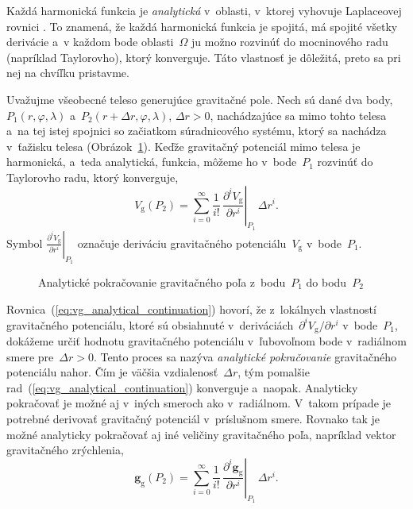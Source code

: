 \documentclass[a4paper,12pt]{book}
\newcommand{\gidx}{\mathrm g}
\let\vec\mathbf
\begin{document}
Každá harmonická funkcia je \emph{analytická} v~oblasti, v~ktorej vyhovuje
Laplaceovej rovnici \parencite{MoritzPhysicalGeodesy}.  To znamená, že každá
harmonická funkcia je spojitá, má spojité všetky derivácie a~v každom bode
oblasti~$\Omega$ ju možno rozvinúť do mocninového radu (napríklad Taylorovho),
ktorý konverguje.  Táto vlastnosť je dôležitá, preto sa pri nej na chvíľku
pristavme.

Uvažujme všeobecné teleso generujúce gravitačné pole.  Nech sú dané dva body,
$P_1(r, \varphi, \lambda)$ a~$P_2(r + \Delta r, \varphi, \lambda)$, $\Delta
r > 0$, nachádzajúce sa mimo tohto telesa a~na tej istej spojnici so začiatkom
súradnicového systému, ktorý sa nachádza v~ťažisku telesa
(Obrázok~\ref{fig:analytical_continuation}).  Keďže gravitačný potenciál mimo
telesa je harmonická, a~teda analytická, funkcia, môžeme ho v~bode~$P_1$
rozvinúť do Taylorovho radu, ktorý konverguje,
%
\begin{equation}
\label{eq:vg_analytical_continuation}
V_\gidx(P_2) = \sum_{i = 0}^\infty \frac{1}{i!} \, \left.\frac{\partial^i
V_\gidx}{\partial r^i}\right|_{P_1} \, \Delta r^i{.}
\end{equation}
%
Symbol $\left.\frac{\partial^i V_\gidx}{\partial r^i} \right|_{P_1}$ označuje 
deriváciu gravitačného potenciálu~$V_\gidx$ v~bode~$P_1$.

\begin{figure}

\centering

\caption{Analytické pokračovanie gravitačného poľa z~bodu~$P_1$ do bodu~$P_2$}
\label{fig:analytical_continuation}
\end{figure}

Rovnica~(\ref{eq:vg_analytical_continuation}) hovorí, že z~lokálnych vlastností 
gravitačného potenciálu, ktoré sú obsiahnuté v~deriváciách~$\partial^i V_\gidx 
\slash \partial r^i$ v~bode~$P_1$, dokážeme určiť hodnotu gravitačného 
potenciálu v~ľubovoľnom bode v~radiálnom smere pre~$\Delta r > 0$.  Tento 
proces sa nazýva \emph{analytické pokračovanie} gravitačného potenciálu nahor.  
Čím je väčšia vzdialenosť~$\Delta r$, tým pomalšie 
rad~(\ref{eq:vg_analytical_continuation}) konverguje a~naopak.  Analyticky 
pokračovať je možné aj v~iných smeroch ako v~radiálnom.  V~takom prípade je 
potrebné derivovať gravitačný potenciál v~príslušnom smere.  Rovnako tak je 
možné analyticky pokračovať aj iné veličiny gravitačného poľa, napríklad vektor 
gravitačného zrýchlenia,
%
\begin{equation}
\label{eq:gg_analytical_continuation}
\vec g_\gidx(P_2) = \sum_{i = 0}^{\infty} \frac{1}{i!} \, 
\left.\frac{\partial^i \vec
g_\gidx}{\partial r^i}\right|_{P_1} \, \Delta r^i{.}
\end{equation}
\end{document}
